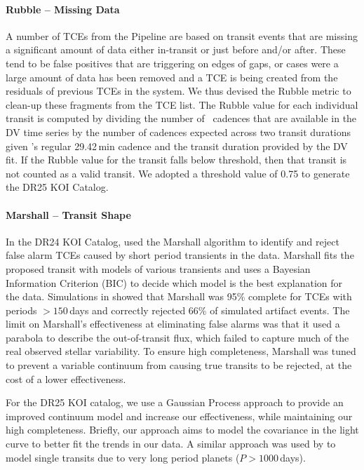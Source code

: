 \paragraph{Rubble -- Missing Data}
\label{s:rubble}
A number of TCEs from the \kepler{} Pipeline are based on transit events that are missing a significant amount of data either in-transit or just before and/or after. These tend to be false positives that are triggering on edges of gaps, or cases were a large amount of data has been removed and a TCE is being created from the residuals of previous TCEs in the system. We thus devised the Rubble metric to clean-up these fragments from the TCE list. The Rubble value for each individual transit is computed by dividing the number of \Kepler\ cadences that are available in the DV time series by the number of cadences expected across two transit durations given \Kepler's regular 29.42\,min cadence and the transit duration provided by the DV fit. If the Rubble value for the transit falls below threshold, then that transit is not counted as a valid transit. We adopted a threshold value of 0.75 to generate the DR25 KOI Catalog.


\paragraph{Marshall -- Transit Shape}
\label{s:marshall}
In the DR24 KOI Catalog, \citet{Coughlin2016} used the Marshall algorithm \citep{Mullally2016} to identify and reject false alarm TCEs caused by short period transients in the data. Marshall fits the proposed transit with models of various transients and uses a Bayesian Information Criterion (BIC) to decide which model is the best explanation for the data. Simulations in \citet{Mullally2016} showed that Marshall was 95\% complete for TCEs with periods $>150$\,days and correctly rejected 66\% of simulated artifact events. The limit on Marshall's effectiveness at eliminating false alarms was that it used a parabola to describe the out-of-transit flux, which failed to capture much of the real observed stellar variability. To ensure high completeness, Marshall was tuned to prevent a variable continuum from causing true transits to be rejected, at the cost of a lower effectiveness.

For the DR25 KOI catalog, we use a Gaussian Process approach \citep[GP,][]{Rasmussen10} to provide an improved continuum model and increase our effectiveness, while maintaining our high completeness. Briefly, our approach aims to model the covariance in the light curve to better fit the trends in our data.
A similar approach was used by \citet{ForemanMackey16} to model single transits due to very long period planets ($P > 1000$\,days).

